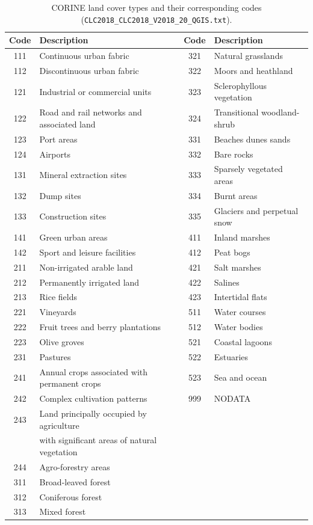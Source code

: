 \begin{table}[htbp]
    \centering
    \begin{tabular}{|c|l|c|l|}
        \hline
        \textbf{Code} & \textbf{Description} & \textbf{Code} & \textbf{Description} \\
        \hline
        111 & Continuous urban fabric & 321 & Natural grasslands \\
        112 & Discontinuous urban fabric & 322 & Moors and heathland \\
        121 & Industrial or commercial units & 323 & Sclerophyllous vegetation \\
        122 & Road and rail networks and associated land & 324 & Transitional woodland-shrub \\
        123 & Port areas & 331 & Beaches dunes sands \\
        124 & Airports & 332 & Bare rocks \\
        131 & Mineral extraction sites & 333 & Sparsely vegetated areas \\
        132 & Dump sites & 334 & Burnt areas \\
        133 & Construction sites & 335 & Glaciers and perpetual snow \\
        141 & Green urban areas & 411 & Inland marshes \\
        142 & Sport and leisure facilities & 412 & Peat bogs \\
        211 & Non-irrigated arable land & 421 & Salt marshes \\
        212 & Permanently irrigated land & 422 & Salines \\
        213 & Rice fields & 423 & Intertidal flats \\
        221 & Vineyards & 511 & Water courses \\
        222 & Fruit trees and berry plantations & 512 & Water bodies \\
        223 & Olive groves & 521 & Coastal lagoons \\
        231 & Pastures & 522 & Estuaries \\
        241 & Annual crops associated with permanent crops & 523 & Sea and ocean \\
        242 & Complex cultivation patterns & 999 & NODATA \\
        243 & Land principally occupied by agriculture & & \\
        & with significant areas of natural vegetation & & \\
        244 & Agro-forestry areas & & \\
   
        311 & Broad-leaved forest & & \\
        312 & Coniferous forest & & \\
        313 & Mixed forest & & \\
        \hline
    \end{tabular}
    \caption{CORINE land cover types and their corresponding codes (\texttt{CLC2018\_CLC2018\_V2018\_20\_QGIS.txt}).}
    \label{tab:CLC-codes}
\end{table}

